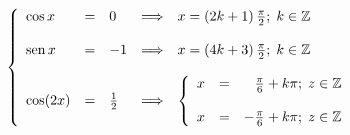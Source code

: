 \documentclass{article} %
\newcommand{\sen}{\mathop{\rm sen}\nolimits} %
\newcommand{\Z}{\mathbb{Z}}
\begin{document}
$$
\left\{
\begin{array}{lclcl}
\cos x &=& 0 &\Longrightarrow & x=(2k+1)\,\frac{\pi}{2};\; k \in \Z\\
& & & &\\
\sen x &=& -1 &\Longrightarrow & x=(4k+3)\,\frac{\pi}{2};\; k \in \Z\\
& & & &\\
\cos(2x) &=&\frac{1}{2} &\Longrightarrow &\left\{
\begin{array}{lcr}
x &=& \frac{\pi}{6}+k\pi;\; z \in \Z\\
& &\\
x &=& -\frac{\pi}{6}+k\pi;\; z \in \Z\\
\end{array}
\right.\\
\end{array}
\right.
$$
\end{document}
